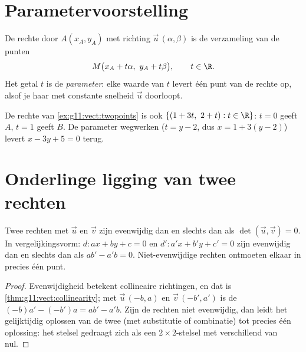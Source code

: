 \section{Parametervoorstelling}

\begin{definition}[Parametervoorstelling]\label{def:g11:vect:parametric}
De rechte door $A(x_A, y_A)$ met richting $\vec u\,(\alpha, \beta)$ is de
verzameling van de punten
\[
M\bigl(x_A + t\alpha,\ y_A + t\beta\bigr), \qquad t \in \R .
\]
Het getal $t$ is de \emph{parameter}: elke waarde van $t$ levert één punt van
de rechte op, alsof je haar met constante snelheid $\vec u$ doorloopt.
\end{definition}

\begin{example}
De rechte van \cref{ex:g11:vect:twopoints} is ook
$\{(1 + 3t,\ 2 + t) : t \in \R\}$: $t = 0$ geeft $A$, $t = 1$ geeft $B$. De
parameter wegwerken ($t = y - 2$, dus $x = 1 + 3(y-2)$) levert
$x - 3y + 5 = 0$ terug.
\end{example}

\section{Onderlinge ligging van twee rechten}

\begin{proposition}\label{prop:g11:vect:positions}
Twee rechten met  $\vec u$ en $\vec v$ zijn evenwijdig dan
en slechts dan als $\det(\vec u, \vec v) = 0$. In vergelijkingsvorm:
$d : ax + by + c = 0$ en $d' : a'x + b'y + c' = 0$ zijn evenwijdig dan en
slechts dan als $ab' - a'b = 0$. Niet-evenwijdige rechten ontmoeten elkaar in
precies één punt.
\end{proposition}

\begin{proof}
Evenwijdigheid betekent collineaire richtingen, en dat is
\cref{thm:g11:vect:collinearity}; met $\vec u\,(-b, a)$ en
$\vec v\,(-b', a')$ is de  $(-b)a' - (-b')a = ab' - a'b$. Zijn de
rechten niet evenwijdig, dan leidt het gelijktijdig oplossen van de twee
 (met substitutie of combinatie) tot precies één oplossing: het
stelsel gedraagt zich als een $2 \times 2$-stelsel met 
verschillend van nul.
\end{proof}

